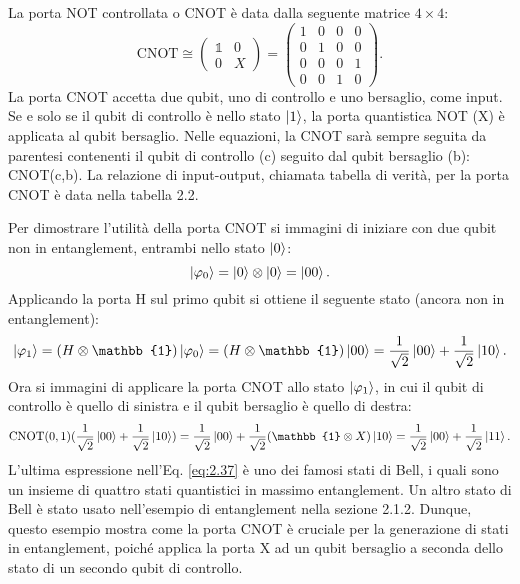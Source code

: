 La porta NOT controllata o CNOT è data dalla seguente matrice $4\times4$: 
\begin{equation} \label{eq:2.34}
    \text{CNOT} \cong 
    \begin{pmatrix}
        \mathbb{1} & 0 \\ 0 & X
    \end{pmatrix}
    =
    \begin{pmatrix}
        1&0&0&0\\
        0&1&0&0\\
        0&0&0&1\\
        0&0&1&0
    \end{pmatrix}
    .
\end{equation}
La porta CNOT accetta due qubit, uno di controllo e uno bersaglio, come input. 
Se e solo se il qubit di controllo è nello stato $\ket{1}$, la porta quantistica 
NOT (X) è applicata al qubit bersaglio. Nelle equazioni, la CNOT sarà sempre 
seguita da parentesi contenenti il qubit di controllo (c) seguito dal qubit 
bersaglio (b): %
CNOT(c,b). La relazione di input-output, chiamata tabella di verità, per la porta 
CNOT è data nella tabella 2.2. 

Per dimostrare l'utilità della porta CNOT si immagini di iniziare con due 
qubit non in entanglement, entrambi nello stato $\ket{0}$: 
\begin{equation} \label{eq:2.35}
    \ket{\varphi_0} = \ket{0} \otimes \ket{0} = \ket{00}.
\end{equation}
Applicando la porta H sul primo qubit si ottiene il seguente stato (ancora non 
in entanglement): 
\begin{equation} \label{eq:2.36}
    \ket{\varphi_1} = (H \otimes \mathbb{1}) \ket{\varphi_0} = 
    (H \otimes \mathbb{1}) \ket{00} = \frac{1}{\sqrt{2}} \ket{00} + 
    \frac{1}{\sqrt{2}} \ket{10}.
\end{equation}
Ora si immagini di applicare la porta CNOT allo stato $\ket{\varphi_1}$, in cui 
il qubit di controllo è quello di sinistra e il qubit bersaglio è quello di 
destra: 
\begin{equation} \label{eq:2.37}
    \text{CNOT}(0,1)(\frac{1}{\sqrt{2}} \ket{00} + \frac{1}{\sqrt{2}} \ket{10}) = 
    \frac{1}{\sqrt{2}} \ket{00} + \frac{1}{\sqrt{2}} (\mathbb{1} \otimes 
    X) \ket{10} = \frac{1}{\sqrt{2}} \ket{00} + \frac{1}{\sqrt{2}} \ket{11}.
\end{equation}
L'ultima espressione nell'Eq. \ref{eq:2.37} è uno dei famosi stati di Bell, 
i quali sono un insieme di quattro stati quantistici in massimo entanglement. 
Un altro stato di Bell è stato usato nell'esempio di entanglement nella sezione 
2.1.2. Dunque, questo esempio mostra come la porta CNOT è cruciale per la 
generazione di stati in entanglement, poiché applica la porta X ad un qubit 
bersaglio a seconda dello stato di un secondo qubit di controllo. 

